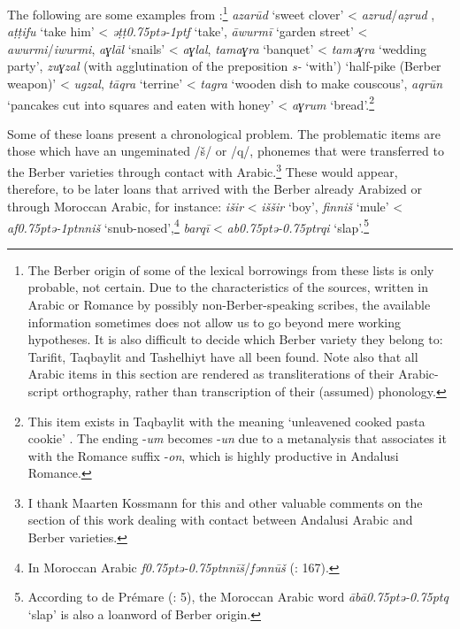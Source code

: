 \documentclass[output=paper,modfonts,nonflat]{langsci/langscibook}
\begin{document}
The following are some examples from \citet{CorrientePereiraVicente2017}:\footnote{The Berber origin of some of the lexical borrowings from these lists is only probable, not certain. Due to the characteristics of the sources, written in Arabic or Romance by possibly non-Berber-speaking scribes, the available information sometimes does not allow us to go beyond mere working hypotheses. It is also difficult to decide which Berber variety they belong to: Tarifit, Taqbaylit and Tashelhiyt have all been found. Note also that all Arabic items in this section are rendered as transliterations of their Arabic-script orthography, rather than transcription of their (assumed) phonology.} \textit{azarūd} ‘sweet clover’ < \textit{azrud}/\textit{aẓrud} , \textit{aṭṭifu} ‘take him’ < \textit{ǝṭṭ\kern 0.75ptǝ\kern -1ptf} ‘take’, \textit{āwurmī} ‘garden street’ < \textit{awurmi}/\textit{iwurmi}, \textit{aɣlāl} ‘snails’ < \textit{aɣlal}, \textit{tamaɣra} ‘banquet’ < \textit{tamǝɣra} `wedding party', \textit{zuɣzal} ({with agglutination of the preposition} \textit{s-} ‘with’) ‘half-pike (Berber weapon)’ < \textit{ugzal}, \textit{tāqra} `terrine' < \textit{tagra} `wooden dish to make couscous’, \textit{aqrūn} ‘pancakes cut into squares and eaten with honey’ < \textit{aɣrum} ‘bread’.\footnote{This item exists in Taqbaylit with the meaning ‘unleavened cooked pasta cookie’ \citep{Dallet1982}. The ending -\textit{um} becomes -\textit{un} due to a metanalysis that associates it with the Romance suffix -\textit{on}, which is highly productive in Andalusi Romance.} 

Some of these loans present a chronological problem. The problematic items are those which have an ungeminated /š/ or /q/, phonemes that were transferred to the Berber varieties through contact with Arabic.\footnote{I thank Maarten Kossmann for this and other valuable comments on the section of this work dealing with contact between Andalusi Arabic and Berber varieties.} These would appear, therefore, to be later loans that arrived with the Berber already Arabized or through Moroccan Arabic, for instance: \textit{išir} < \textit{iššir} ‘boy’, \textit{finniš} ‘mule’ < \textit{af\kern 0.75ptǝ\kern -1ptnniš} ‘snub-nosed’,\footnote{In Moroccan Arabic \textit{f\kern 0.75ptǝ\kern -0.75ptnnīš}/\textit{fənnūš} (\citealt{Prémare1998}: 167).}  \textit{barqī} < \textit{ab\kern 0.75ptǝ\kern -0.75ptrqi} ‘slap’.\footnote{According to de Prémare (\citeyear{Prémare1993}: 5), the Moroccan Arabic word \textit{ābā{\R}\kern 0.75ptǝ\kern -0.75ptq} ‘slap’ is also a loanword of Berber origin.}
\end{document}
